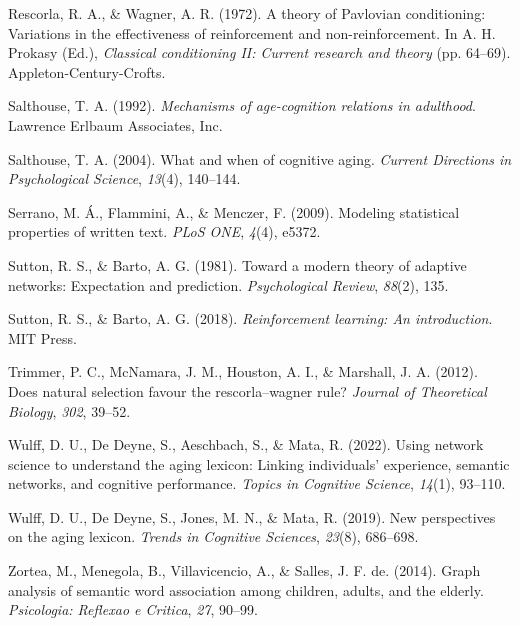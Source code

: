 \documentclass[
  man]{apa6}
\newlength{\cslhangindent}
\newlength{\cslentryspacingunit} %
\newenvironment{CSLReferences}[2] %
 {%
  \setlength{\parindent}{0pt}
  \ifodd #1
  \let\oldpar\par
  \def\par{\hangindent=\cslhangindent\oldpar}
  \fi
  \setlength{\parskip}{#2\cslentryspacingunit}
 }%
 {}
\begin{document}
\begin{CSLReferences}{1}{0}
\leavevmode{}%
Rescorla, R. A., \& Wagner, A. R. (1972). {A theory of Pavlovian conditioning: Variations in the effectiveness of reinforcement and non-reinforcement}. In A. H. Prokasy (Ed.), \emph{Classical conditioning II: Current research and theory} (pp. 64--69). Appleton-Century-Crofts.

\leavevmode{}%
Salthouse, T. A. (1992). \emph{Mechanisms of age-cognition relations in adulthood}. Lawrence Erlbaum Associates, Inc.

\leavevmode{}%
Salthouse, T. A. (2004). {What and when of cognitive aging}. \emph{Current Directions in Psychological Science}, \emph{13}(4), 140--144.

\leavevmode{}%
Serrano, M. Á., Flammini, A., \& Menczer, F. (2009). Modeling statistical properties of written text. \emph{PLoS ONE}, \emph{4}(4), e5372.

\leavevmode{}%
Sutton, R. S., \& Barto, A. G. (1981). Toward a modern theory of adaptive networks: Expectation and prediction. \emph{Psychological Review}, \emph{88}(2), 135.

\leavevmode{}%
Sutton, R. S., \& Barto, A. G. (2018). \emph{Reinforcement learning: An introduction}. MIT Press.

\leavevmode{}%
Trimmer, P. C., McNamara, J. M., Houston, A. I., \& Marshall, J. A. (2012). Does natural selection favour the rescorla--wagner rule? \emph{Journal of Theoretical Biology}, \emph{302}, 39--52.

\leavevmode{}%
Wulff, D. U., De Deyne, S., Aeschbach, S., \& Mata, R. (2022). Using network science to understand the aging lexicon: Linking individuals' experience, semantic networks, and cognitive performance. \emph{Topics in Cognitive Science}, \emph{14}(1), 93--110.

\leavevmode{}%
Wulff, D. U., De Deyne, S., Jones, M. N., \& Mata, R. (2019). New perspectives on the aging lexicon. \emph{Trends in Cognitive Sciences}, \emph{23}(8), 686--698.

\leavevmode{}%
Zortea, M., Menegola, B., Villavicencio, A., \& Salles, J. F. de. (2014). Graph analysis of semantic word association among children, adults, and the elderly. \emph{Psicologia: Reflexao e Critica}, \emph{27}, 90--99.

\end{CSLReferences}
\end{document}

